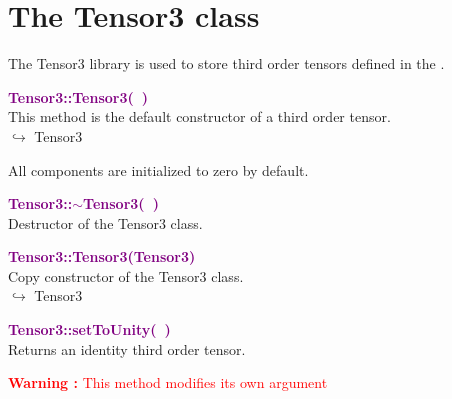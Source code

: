 \section{The Tensor3 class}

The Tensor3 library is used to store third order tensors defined in the \DynELA.

\textcolor{purple}{\textbf{Tensor3::Tensor3(~)}}\label{Tensor3::Tensor3()}\\
This method is the default constructor of a third order tensor.\\ \hspace*{10mm}$\hookrightarrow$ Tensor3

All components are initialized to zero by default.

\textcolor{purple}{\textbf{Tensor3::$\sim$Tensor3(~)}}\label{Tensor3::~Tensor3()}\\
Destructor of the Tensor3 class.


\textcolor{purple}{\textbf{Tensor3::Tensor3(Tensor3)}}\label{Tensor3::Tensor3(Tensor3)}\\
Copy constructor of the Tensor3 class.\\ \hspace*{10mm}$\hookrightarrow$ Tensor3


\textcolor{purple}{\textbf{Tensor3::setToUnity(~)}}\label{Tensor3::setToUnity()}\\
Returns an identity third order tensor.

\hspace*{10mm}\textcolor{red}{\textbf{Warning :} This method modifies its own argument}


